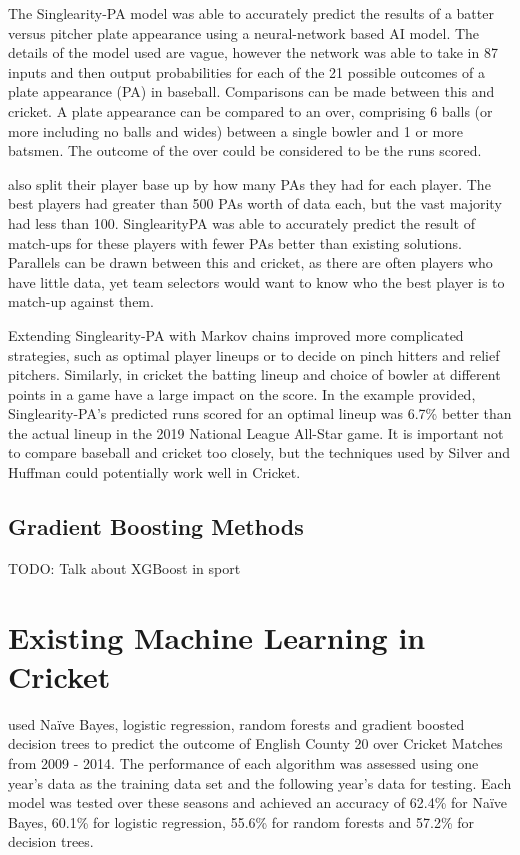 \documentclass[12pt,a4paper]{report}
\begin{document}
The Singlearity-PA model \citep{silver2021baseball} was able to accurately predict the results of a batter versus pitcher plate appearance using a neural-network based AI model. 
The details of the model used are vague, however the network was able to take in 87 inputs and then output probabilities for each of the 21 possible outcomes of a plate appearance (PA) in baseball. 
Comparisons can be made between this and cricket. 
A plate appearance can be compared to an over, comprising 6 balls (or more including no balls and wides) between a single bowler and 1 or more batsmen. 
The outcome of the over could be considered to be the runs scored. 

\citet{silver2021baseball} also split their player base up by how many PAs they had for each player. 
The best players had greater than 500 PAs worth of data each, but the vast majority had less than 100. 
SinglearityPA was able to accurately predict the result of match-ups for these players with fewer PAs better than existing solutions. 
Parallels can be drawn between this and cricket, as there are often players who have little data, yet team selectors would want to know who the best player is to match-up against them.

Extending Singlearity-PA with Markov chains improved more complicated strategies, such as optimal player lineups or to decide on pinch hitters and relief pitchers. 
Similarly, in cricket the batting lineup and choice of bowler at different points in a game have a large impact on the score. 
In the example provided, Singlearity-PA's predicted runs scored for an optimal lineup was 6.7\% better than the actual lineup in the 2019 National League All-Star game. 
It is important not to compare baseball and cricket too closely, but the techniques used by Silver and Huffman could potentially work well in Cricket.

\subsection{Gradient Boosting Methods}

 TODO: Talk about XGBoost in sport

\section{Existing Machine Learning in Cricket}

\citet{KampakisStylianos2015} used Naïve Bayes, logistic regression, random forests and gradient boosted decision trees to predict the outcome of English County 20 over Cricket Matches from 2009 - 2014. 
The performance of each algorithm was assessed using one year's data as the training data set and the following year's data for testing. 
Each model was tested over these seasons and achieved an accuracy of 62.4\% for Naïve Bayes, 60.1\% for logistic regression, 55.6\% for random forests and 57.2\% for decision trees.
\end{document}
